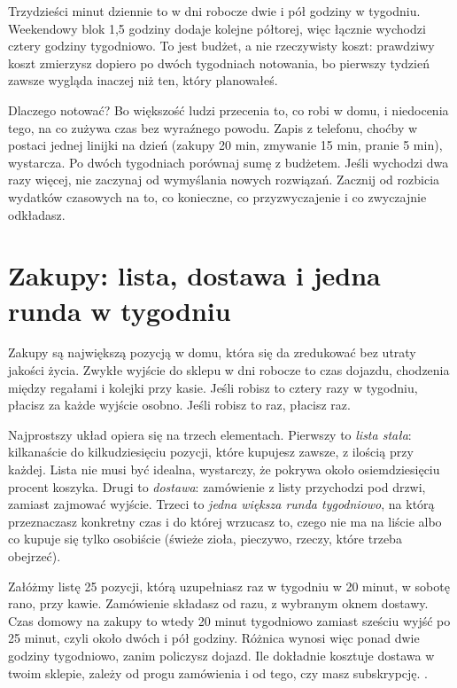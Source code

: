Trzydzieści minut dziennie to w dni robocze dwie i pół godziny w tygodniu.
Weekendowy blok 1,5 godziny dodaje kolejne półtorej, więc łącznie wychodzi
cztery godziny tygodniowo. To jest budżet, a nie rzeczywisty koszt:
prawdziwy koszt zmierzysz dopiero po dwóch tygodniach notowania, bo
pierwszy tydzień zawsze wygląda inaczej niż ten, który planowałeś.

Dlaczego notować? Bo większość ludzi przecenia to, co robi w domu, i
niedocenia tego, na co zużywa czas bez wyraźnego powodu. Zapis z telefonu,
choćby w postaci jednej linijki na dzień (zakupy 20 min, zmywanie 15 min,
pranie 5 min), wystarcza. Po dwóch tygodniach porównaj sumę z budżetem.
Jeśli wychodzi dwa razy więcej, nie zaczynaj od wymyślania nowych rozwiązań.
Zacznij od rozbicia wydatków czasowych na to, co konieczne, co
przyzwyczajenie i co zwyczajnie odkładasz.

\section{Zakupy: lista, dostawa i jedna runda w tygodniu}

Zakupy są największą pozycją w domu, która się da zredukować bez utraty
jakości życia. Zwykłe wyjście do sklepu w dni robocze to czas dojazdu,
chodzenia między regałami i kolejki przy kasie. Jeśli robisz to cztery razy
w tygodniu, płacisz za każde wyjście osobno. Jeśli robisz to raz, płacisz
raz.

Najprostszy układ opiera się na trzech elementach. Pierwszy to \emph{lista
stała}: kilkanaście do kilkudziesięciu pozycji, które kupujesz zawsze, z
ilością przy każdej. Lista nie musi być idealna, wystarczy, że pokrywa
około osiemdziesięciu procent koszyka. Drugi to \emph{dostawa}: zamówienie
z listy przychodzi pod drzwi, zamiast zajmować wyjście. Trzeci to
\emph{jedna większa runda tygodniowo}, na którą przeznaczasz konkretny
czas i do której wrzucasz to, czego nie ma na liście albo co kupuje się
tylko osobiście (świeże zioła, pieczywo, rzeczy, które trzeba obejrzeć).

\begin{przyklad}
Załóżmy listę 25 pozycji, którą uzupełniasz raz w tygodniu w 20 minut,
w sobotę rano, przy kawie. Zamówienie składasz od razu, z wybranym oknem
dostawy. Czas domowy na zakupy to wtedy 20 minut tygodniowo zamiast
sześciu wyjść po 25 minut, czyli około dwóch i pół godziny. Różnica
wynosi więc ponad dwie godziny tygodniowo, zanim policzysz dojazd.
Ile dokładnie kosztuje dostawa w twoim sklepie, zależy od progu zamówienia
i od tego, czy masz subskrypcję. .
\end{przyklad}

